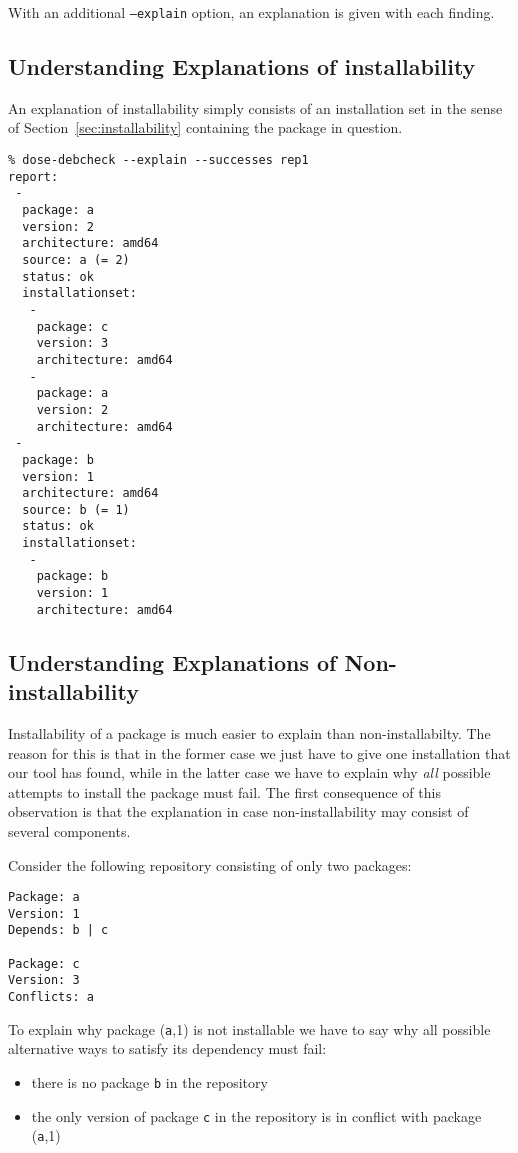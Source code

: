 With an additional \texttt{--explain} option, an explanation is given
with each finding. 

\subsection{Understanding Explanations of installability}

An explanation of installability simply consists of an
installation set in the sense of Section~\ref{sec:installability}
containing the package in question.

\begin{example}
\begin{verbatim}
% dose-debcheck --explain --successes rep1
report:
 -
  package: a
  version: 2
  architecture: amd64
  source: a (= 2)
  status: ok
  installationset:
   -
    package: c
    version: 3
    architecture: amd64
   -
    package: a
    version: 2
    architecture: amd64
 -
  package: b
  version: 1
  architecture: amd64
  source: b (= 1)
  status: ok
  installationset:
   -
    package: b
    version: 1
    architecture: amd64
\end{verbatim}
\end{example}

\subsection{Understanding Explanations of Non-installability}

Installability of a package is much easier to explain than
non-installabilty. The reason for this is that in the former case we
just have to give one installation that our tool has found, while in
the latter case we have to explain why \emph{all} possible attempts to
install the package must fail. The first consequence of this
observation is that the explanation in case non-installability may
consist of several components.

\begin{example}
  Consider the following repository consisting of only two packages:
\begin{verbatim}
Package: a
Version: 1
Depends: b | c

Package: c
Version: 3
Conflicts: a
\end{verbatim}
To explain why package (\texttt{a},1) is not installable we have to
say why all possible alternative ways to satisfy its dependency must
fail:
\begin{itemize}
\item there is no package \texttt{b} in the repository
\item the only version of package \texttt{c} in the repository is in
  conflict with package (\texttt{a},1)
\end{itemize}
\end{example}

